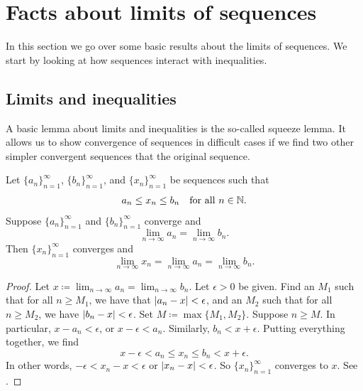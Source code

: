 
\sectionnewpage
\section{Facts about limits of sequences}
\label{sec:factslimsseqs}


In this section we go over some basic results about the limits of
sequences.
We start by looking at how sequences interact with inequalities.

\subsection{Limits and inequalities}

A basic lemma about limits and inequalities is the so-called squeeze lemma.
It allows us to show convergence of sequences in difficult cases
if we find two other simpler convergent sequences that 
 the original sequence.

\begin{lemma} \label{squeeze:lemma}
Let $\{ a_n \}_{n=1}^\infty$, 
$\{ b_n \}_{n=1}^\infty$, and 
$\{ x_n \}_{n=1}^\infty$ be sequences such that
\begin{equation*}
a_n \leq x_n \leq b_n \quad \text{for all } n \in {\mathbb{N}}.
\end{equation*}
Suppose $\{ a_n \}_{n=1}^\infty$ and $\{ b_n \}_{n=1}^\infty$ converge and
\begin{equation*}
\lim_{n\to \infty} a_n
=
\lim_{n\to \infty} b_n .
\end{equation*}
Then $\{ x_n \}_{n=1}^\infty$ converges and
\begin{equation*}
\lim_{n\to \infty} x_n
=
\lim_{n\to \infty} a_n
=
\lim_{n\to \infty} b_n .
\end{equation*}
\end{lemma}

\begin{proof}
Let $x \coloneqq \lim_{n\to\infty} a_n = \lim_{n\to\infty} b_n$.
Let $\epsilon > 0$ be given.
Find an $M_1$ such that for all $n \geq M_1$, we have
that $\left\lvert {a_n-x} \right\rvert < \epsilon$, and an $M_2$
such that for all $n \geq M_2$,
we have $\left\lvert {b_n-x} \right\rvert < \epsilon$.  Set $M \coloneqq \max \{M_1, M_2 \}$.
Suppose $n \geq M$.
In particular,
$x - a_n < \epsilon$, or 
$x - \epsilon < a_n$.  Similarly, $b_n < x + \epsilon$.
Putting everything together, we find
\begin{equation*}
x - \epsilon < a_n \leq x_n \leq b_n < x + \epsilon .
\end{equation*}
In other words, $-\epsilon < x_n-x < \epsilon$ or $\left\lvert {x_n-x} \right\rvert < \epsilon$.
So $\{x_n\}_{n=1}^\infty$ converges to $x$.
See .
\end{proof}

